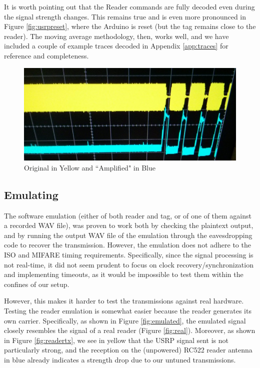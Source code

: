 \documentclass[fleqn,10pt]{SelfArx} %
\begin{document}
It is worth pointing out that the Reader commands are fully decoded even during the signal strength changes. This remains true and is even more pronounced in Figure \ref{fig:usrpreset}, where the Arduino is reset (but the tag remains close to the reader). The moving average methodology, then, works well, and we have included a couple of example traces decoded in Appendix \ref{app:traces} for reference and completeness.

\begin{figure}[h]
  \includegraphics[width=\linewidth]{img/amplified}
  \caption{Original in Yellow and ``Amplified" in Blue}
  \label{fig:amplified}
\end{figure}

\subsection{Emulating}
\label{subsec:evalemulate}

The software emulation (either of both reader and tag, or of one of them against a recorded WAV file), was proven to work both by checking the plaintext output, and by running the output WAV file of the emulation through the eavesdropping code to recover the transmission. However, the emulation does not adhere to the ISO and MIFARE timing requirements. Specifically, since the signal processing is not real-time, it did not seem prudent to focus on clock recovery/synchronization and implementing timeouts, as it would be impossible to test them within the confines of our setup.

However, this makes it harder to test the transmissions against real hardware. Testing the reader emulation is somewhat easier because the reader generates its own carrier. Specifically, as shown in Figure \ref{fig:emulated}, the emulated signal closely resembles the signal of a real reader (Figure \ref{fig:real}). Moreover, as shown in Figure \ref{fig:readertx}, we see in yellow that the USRP signal sent is not particularly strong, and the reception on the (unpowered) RC522 reader antenna in blue already indicates a strength drop due to our untuned transmissions.
\end{document}
